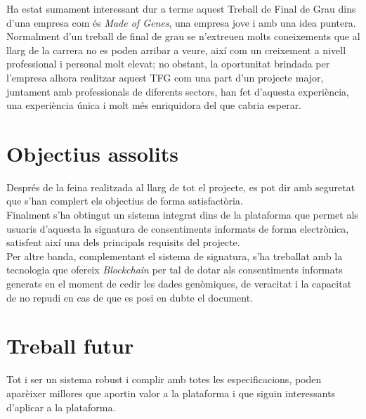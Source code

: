 Ha estat sumament interessant dur a terme aquest Treball de Final de Grau dins d'una empresa com és \textit{Made of Genes}, una empresa jove i amb una idea puntera.\\
Normalment d'un treball de final de grau se n'extreuen molts coneixements que al llarg de la carrera no es poden arribar a veure, així com un creixement a nivell professional i personal molt elevat; no obstant, la oportunitat brindada per l'empresa alhora realitzar aquest TFG com una part d'un projecte major, juntament amb professionals de diferents sectors, han fet d'aquesta experiència, una experiència única i molt més enriquidora del que cabria esperar.

\section{Objectius assolits}
Després de la feina realitzada al llarg de tot el projecte, es pot dir amb seguretat que s'han complert els objectius de forma satisfactòria.\\
\newline Finalment s'ha obtingut un sistema integrat dins de la plataforma que permet als usuaris d'aquesta la signatura de consentiments informats de forma electrònica, satisfent així una dels principals requisits del projecte.\\
\newline Per altre banda, complementant el sistema de signatura, s'ha treballat amb la tecnologia que ofereix \textit{Blockchain} per tal de dotar als consentiments informats generats en el moment de cedir les dades genòmiques, de veracitat i la capacitat de no repudi en cas de que es posi en dubte el document.

\section{Treball futur}
Tot i ser un sistema robust i complir amb totes les especificacions, poden aparèixer millores que aportin valor a la plataforma i que siguin interessants d'aplicar a la plataforma.\\

\clearpage